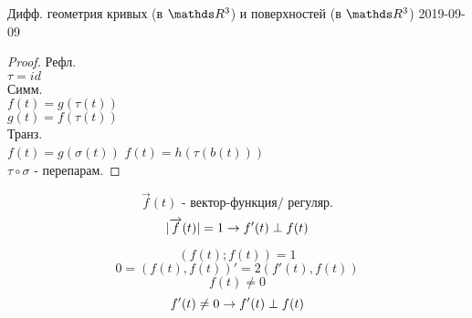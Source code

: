 \documentclass[main, 12pt, fleqn]{subfiles}
\begin{document}
\begin{lect} {Дифф. геометрия кривых (в $\R^3$) и поверхностей (в $\R^3$) 2019-09-09}
	\begin{proof}
			Рефл.\\
			$\tau = id$\\
			Симм.\\
			$f(t) = g(\tau(t))$\\
			$g(t) = f(\tau(t))$\\
			Транз.\\
			$f(t) = g(\sigma(t))$
			$f(t) = h(\tau(b(t))) $\\
			$\tau \circ \sigma$ - перепарам.
	\end{proof}

	\begin{Lemma}
		\[\overrightarrow{f}(t) \text{ - вектор-функция/ регуляр.}\]
		\[|\overrightarrow{f}(t)| = 1 \rightarrow f'(t) \perp f(t)\]
	\end{Lemma}

	\begin{Proof}
		\[(f(t); f(t)) = 1\]
		\[0 = (f(t), f(t))' = 2(f'(t), f(t))\]
		\[f(t) \neq 0\]
		\[f'(t) \neq 0 \rightarrow f'(t) \perp f(t)\]
	\end{Proof}
\end{lect}
\end{document}
